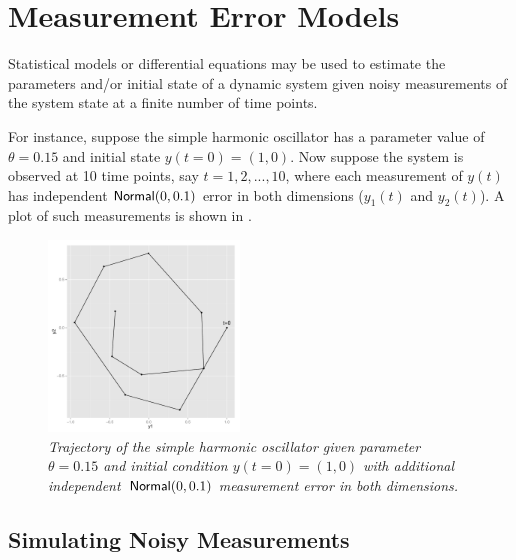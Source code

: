 \section{Measurement Error Models}

Statistical models or differential equations may be used to estimate
the parameters and/or initial state of a dynamic system given noisy
measurements of the system state at a finite number of time points.

For instance, suppose the simple harmonic oscillator has a parameter
value of $\theta = 0.15$ and initial state $y(t=0) = (1,0)$.  Now
suppose the system is observed at 10 time points, say $t=1, 2, ...,
10$, where each measurement of $y(t)$ has independent
$\mbox{\sf Normal}(0, 0.1)$ error in both dimensions ($y_1(t)$ and
$y_2(t)$).  A plot of such measurements is shown in
.
%
\begin{figure}
\begin{center}
\includegraphics[height=2in]{img/sho-ode-trajectory.pdf}%
\end{center}
\vspace*{-0.25in}
\caption{\small\it Trajectory of the simple harmonic oscillator given
  parameter $\theta=0.15$ and initial condition $y(t=0) = (1,0)$ with
  additional independent\ $\mbox{\sf Normal}(0,0.1)$ measurement error
  in both dimensions.}%
\label{sho-trajectory.figure}
\end{figure}



\subsection{Simulating Noisy Measurements}

